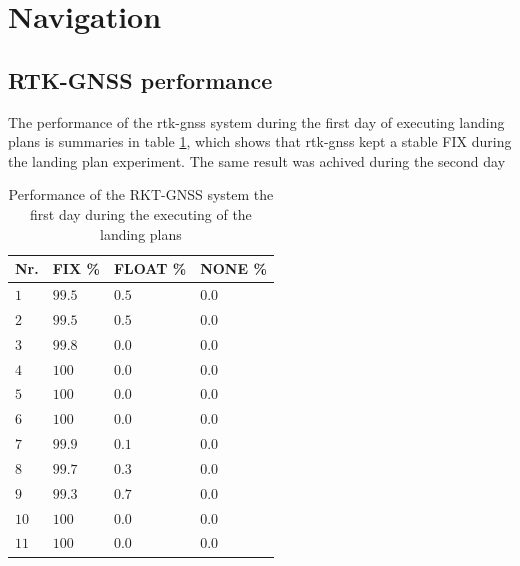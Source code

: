 \section{Navigation}\label{ss:EXNavigation}
\subsection{RTK-GNSS performance}
The performance of the \gls{rtk-gnss} system during the first day of executing landing plans is summaries in table \ref{TB:RTKFirstDayLanding}, which shows that \gls{rtk-gnss} kept a stable FIX during the landing plan experiment. The same result was achived during the second day
\begin{table}
\centering
\begin{tabular}{| l | l | l | l |}
\hline
\textbf{Nr.}	& \textbf{FIX \%}	& \textbf{FLOAT \%}	& \textbf{NONE \%}	\\ \hline
$1$				& $99.5 $	& $0.5$	& $0.0$									\\ \hline
$2$				& $99.5 $	& $0.5$	& $0.0$									\\ \hline
$3$				& $99.8 $	& $0.0$	& $0.0$									\\ \hline
$4$				& $100$		& $0.0$	& $0.0$									\\ \hline
$5$				& $100$		& $0.0$	& $0.0$									\\ \hline
$6$				& $100$		& $0.0$	& $0.0$									\\ \hline
$7$				& $99.9$	& $0.1$	& $0.0$									\\ \hline
$8$				& $99.7 $ 	& $0.3$	& $0.0$									\\ \hline
$9$				& $99.3$	& $0.7$	& $0.0$									\\ \hline
$10$			& $100$		& $0.0$	& $0.0$									\\ \hline
$11$			& $100$		& $0.0$	& $0.0$									\\ \hline
\end{tabular}
\caption{Performance of the RKT-GNSS system the first day during the executing of the landing plans}
\label{TB:RTKFirstDayLanding}
\end{table}
